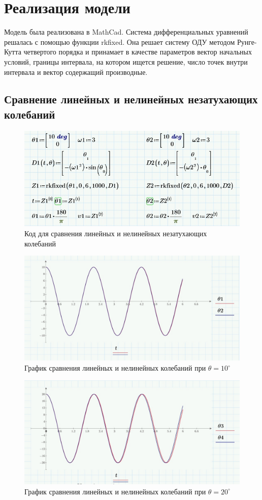 \documentclass[a4paper, 14pt]{extarticle}
\begin{document}
	\pagebreak
	\section{Реализация модели}
		Модель была реализована в MathCad. Система дифференциальных уравнений решалась с помощью функции rkfixed.
		Она решает систему ОДУ методом Рунге-Кутта четвертого порядка и принамает в качестве параметров вектор начальных условий, границы интервала, на котором ищется решение, число точек внутри интервала и вектор содержащий производные.
		\subsection{Сравнение линейных и нелинейных незатухающих колебаний}		
		\begin{figure}[H]
			\centering
			\includegraphics[width = .7\linewidth]{19.jpg}
			\caption[.] {Код для сравнения линейных и нелинейных незатухающих колебаний}
		\end{figure}
		\begin{figure}[H]
			\centering
			\includegraphics[width = \linewidth]{2.jpg}
			\caption[.] {График сравнения линейных и нелинейных колебаний при $\theta = 10^{\circ}$}
		\end{figure}
		\begin{figure}[H]
			\centering
			\includegraphics[width = \linewidth]{4.jpg}
			\caption[.] {График сравнения линейных и нелинейных колебаний при $\theta = 20^{\circ}$}
		\end{figure}
\end{document}
